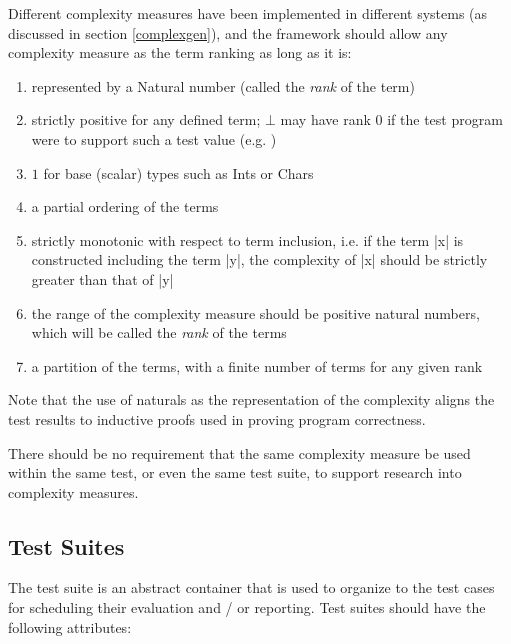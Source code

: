 Different complexity measures have been implemented in different \pbt systems
(as discussed in section \ref{complexgen}),
and the framework should allow any complexity measure as the term ranking
as long as it is:
\begin{enumerate}
	\item represented by a Natural number (called the \emph{rank} of the term)
	\item strictly positive for any defined term; $\bot$ may have rank 0 if the test program were to support such a test value (e.g. \LSC)	
	\item $1$ for base (scalar) types such as Ints or Chars 
	\item a partial ordering of the terms
	\item strictly monotonic with respect to term inclusion,
	i.e. if the term |x| is constructed including the term |y|, the complexity of |x| should be strictly greater than that of |y|
	\item the range of the complexity measure should be positive natural numbers,
	which will be called the \emph{rank} of the terms
	\item a partition of the terms, with a finite number of terms for any given rank
\end{enumerate}
\noindent
Note that the use of naturals as the representation of the complexity aligns
the test results to inductive proofs used in proving program correctness.

There should be no requirement that the same complexity measure be used
within the same test, or even the same test suite,
to support research into complexity measures.

\subsection{Test Suites}

The test suite is an abstract container that is used to
organize to the test cases for 
scheduling their evaluation and / or reporting.
Test suites should have the following attributes:

